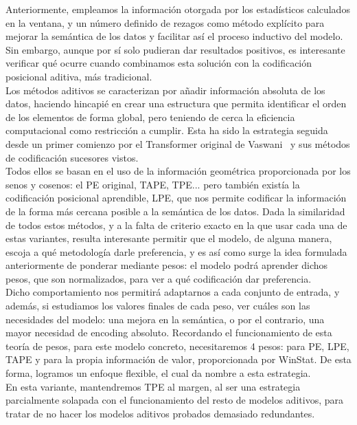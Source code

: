 Anteriormente, empleamos la información otorgada por los estadísticos calculados en la ventana, y un número definido de rezagos como método explícito para mejorar la semántica de los datos y facilitar así el proceso inductivo del modelo. Sin embargo, aunque por sí solo pudieran dar resultados positivos, es interesante verificar qué ocurre cuando combinamos esta solución con la codificación posicional aditiva, más tradicional.\\

Los métodos aditivos se caracterizan por añadir información absoluta de los datos, haciendo hincapié en crear una estructura que permita identificar el orden de los elementos de forma global, pero teniendo de cerca la eficiencia computacional como restricción a cumplir. Esta ha sido la estrategia seguida desde un primer comienzo por el Transformer original de Vaswani~\cite{vaswani2023attentionneed} y sus métodos de codificación sucesores vistos.\\

Todos ellos se basan en el uso de la información geométrica proporcionada por los senos y cosenos: el PE original, TAPE, TPE... pero también existía la codificación posicional aprendible, LPE, que nos permite codificar la información de la forma más cercana posible a la semántica de los datos. Dada la similaridad de todos estos métodos, y a la falta de criterio exacto en la que usar cada una de estas variantes, resulta interesante permitir que el modelo, de alguna manera, escoja a qué metodología darle preferencia, y es así como surge la idea formulada anteriormente de ponderar mediante pesos: el modelo podrá aprender dichos pesos, que son normalizados, para ver a qué codificación dar preferencia.\\

Dicho comportamiento nos permitirá adaptarnos a cada conjunto de entrada, y además, si estudiamos los valores finales de cada peso, ver cuáles son las necesidades del modelo: una mejora en la semántica, o por el contrario, una mayor necesidad de encoding absoluto. Recordando el funcionamiento de esta teoría de pesos, para este modelo concreto, necesitaremos 4 pesos: para PE, LPE, TAPE y para la propia información de valor, proporcionada por WinStat. De esta forma, logramos un enfoque flexible, el cual da nombre a esta estrategia.\\

En esta variante, mantendremos TPE al margen, al ser una estrategia parcialmente solapada con el funcionamiento del resto de modelos aditivos, para tratar de no hacer los modelos aditivos probados demasiado redundantes.

